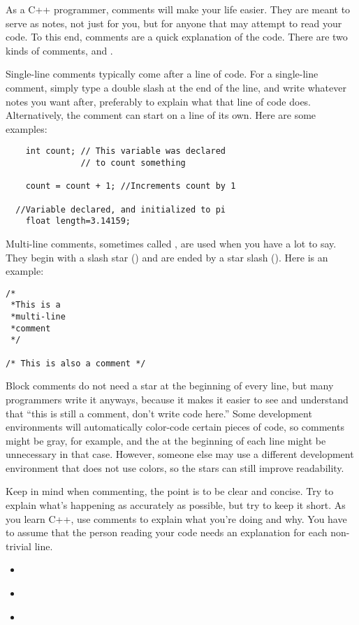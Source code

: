 
As a C++ programmer, comments will make your life easier. 
They are meant to serve as notes, not just for you, but for anyone that may attempt to read your code. 
To this end, comments are a quick explanation of the code. 
There are two kinds of comments,  and .

Single-line comments typically come after a line of code. 
For a single-line comment, simply type a double slash \Code{//} at the end of the line, and write whatever notes you want after, preferably to explain what that line of code does.
Alternatively, the comment can start on a line of its own.
Here are some examples:

\begin{lstlisting}
	int count; // This variable was declared 
	           // to count something

	count = count + 1; //Increments count by 1

  //Variable declared, and initialized to pi
	float length=3.14159; 
\end{lstlisting}

Multi-line comments, sometimes called , are used when you have a lot to say. 
They begin with a slash star (\Code{/*}) and are ended by a star slash (\Code{*/}). 
Here is an example:

\begin{lstlisting}
/* 
 *This is a
 *multi-line 
 *comment
 */
 
/* This is also a comment */ 
\end{lstlisting}

Block comments do not need a star at the beginning of every line, but many programmers write it anyways, because it makes it easier to see and understand that ``this is still a comment, don't write code here.'' 
Some development environments will automatically color-code certain pieces of code, so comments might be gray, for example, and the \Code{*} at the beginning of each line might be unnecessary in that case. 
However, someone else may use a different development environment that does not use colors, so the stars can still improve readability.

Keep in mind when commenting, the point is to be clear and concise. 
Try to explain what's happening as accurately as possible, but try to keep it short. 
As you learn C++, use comments to explain what you're doing and why. 
You have to assume that the person reading your code needs an explanation for each non-trivial line. 






\begin{itemize}
\item ~
\item ~
\item ~
\end{itemize}	

